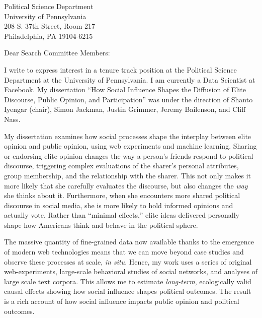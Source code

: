 \documentclass[fontsize=12pt, paper=a4]{scrlttr2}
\date{September 29, 2014}
\begin{document}
\enlargethispage{2\baselineskip}

\begin{letter}{Political Science Department \\
University of Pennsylvania\\
208 S. 37th Street, Room 217\\
Philadelphia, PA 19104-6215}

\opening{Dear Search Committee Members:}  %

I write to express interest in a tenure track position at the Political Science Department at the University of Pennsylvania.  I am currently a Data Scientist at Facebook.  %
My dissertation ``How Social Influence Shapes the Diffusion of Elite Discourse, Public Opinion, and Participation'' was under the direction of Shanto Iyengar (chair), Simon Jackman, Justin Grimmer, Jeremy Bailenson, and Cliff Nass.

My dissertation examines how social processes shape the interplay between elite opinion and public opinion, using web experiments and machine learning.  Sharing or endorsing elite opinion changes the way a person's friends respond to political discourse, triggering complex evaluations of the sharer's personal attributes, group membership, and the relationship with the sharer.  This not only makes it more likely that she carefully evaluates the discourse, but also changes the \emph{way} she thinks about it.  Furthermore, when she encounters more shared political discourse in social media, she is more likely to hold informed opinions and actually vote.  Rather than ``minimal effects,'' elite ideas delivered personally shape how Americans think and behave in the political sphere.

The massive quantity of fine-grained data now available thanks to the emergence of modern web technologies means that we can move beyond case studies and observe these processes at scale, \emph{in situ}.  Hence, my work uses a series of original web-experiments, large-scale behavioral studies of social networks, and analyses of large scale text corpora.  This allows me to estimate \emph{long-term}, ecologically valid causal effects showing how social influence shapes political outcomes.  The result is a rich account of how social influence impacts public opinion and political outcomes.  


\end{letter}
\end{document}

